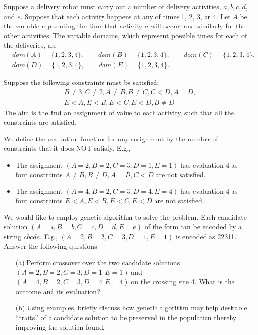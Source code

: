 \documentclass[12pt]{article}
\begin{document}
\makeband


\begin{Q}

\vspace{+0.5ex}




\item Suppose a delivery robot must carry out a number of delivery activities, $a,b,c,d$, and $e$. Suppose that each activity happens at any of times 1, 2, 3, or 4. Let $A$ be the variable reprsenting the time that activity $a$ will occur, and similarly for the other activities. The variable domains, which represent possible times for each of the deliveries, are
    \begin{align*}
        &dom(A) = \{1,2,3,4\}, \qquad dom(B) = \{1,2,3,4\}, \qquad dom(C)=\{1,2,3,4\},\\
        &dom(D) = \{1,2,3,4\}, \qquad dom(E) = \{1,2,3,4\}. &
    \end{align*}

    Suppose the following constraints must be satisfied:
    \begin{align*}
    &B\neq 3, C\neq 2, A\neq B, B\neq C, C<D, A=D,\\
    &E<A, E<B, E<C, E<D, B\neq D
    \end{align*}
    The aim is the find an assignment of value to each activity, such that all the constraints are satisfied.

    We define the evaluation function for any assignment by the number of constraints that it does NOT satisfy. E.g.,

    \begin{itemize}
    \item The assignment $(A=2, B=2,C=3,D=1,E=1)$ has  evaluation 4 as four constraints $A\neq B, B\neq D, A=D, C<D$ are not satisfied.
    \item The assignment $(A=4,B=2,C=3,D=4,E=4)$ has evaluation 4 as four constraints $E<A,E<B,E<C,E<D$ are not satisfied.
    \end{itemize}
    We would like to employ genetic algorithm to solve the problem. Each candidate solution $(A=a,B=b,C=c,D=d,E=e)$ of the form can be encoded by a string $abcde$. E.g., $(A=2, B=2,C=3,D=1,E=1)$ is encoded as 22311.  Answer the following questions
    \begin{itemize}
        \item[(a)] Perform crossover over the two candidate solutions $(A=2, B=2,C=3,D=1,E=1)$ and $(A=4,B=2,C=3,D=4,E=4)$ on the crossing site 4. What is the outcome and its evaluation?
        \item[(b)] Using examples, briefly discuss how genetic algorithm may help desirable ``traits'' of a candidate solution to be preserved in the population thereby improving the solution found.
    \end{itemize}


\end{Q}
\end{document}
